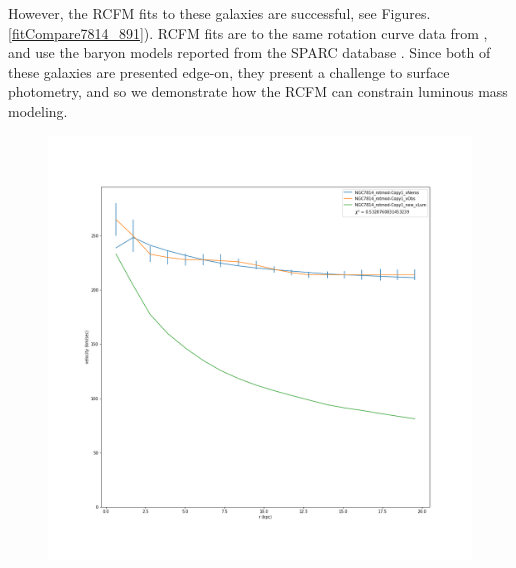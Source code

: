 \documentclass[reprint,%
 amsmath,amssymb,
 aps,
]{revtex4-1}
\begin{document}
 However, the RCFM  
fits to these galaxies are successful, see Figures.\ref{fitCompare7814_891}). 
RCFM fits are to the same rotation curve data from   \cite{Frat}, and  use the baryon models reported from the SPARC database \cite{2016Lelli}. Since both of these galaxies are presented edge-on, they present a challenge to surface photometry, and so we demonstrate how the RCFM can constrain luminous mass modeling.
 
 
 
 \begin{figure}
\centering
\begin{minipage}{.5\textwidth}
  \centering
  \includegraphics[width=.95\linewidth]{figures/NGC7814_rotmod-Copy1_XueSofue.png}
  \label{fig:n7814sparc}
\end{minipage}%
\begin{minipage}{.5\textwidth}
  \centering

\end{minipage}
\end{figure}
\end{document}

